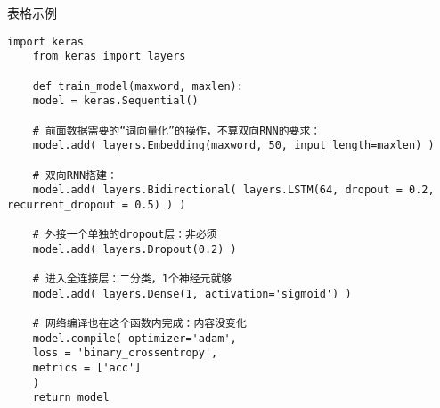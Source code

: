 表格示例


\begin{lstlisting}[caption = cs代码表测试]
	import keras
	from keras import layers
	
	def train_model(maxword, maxlen):
	model = keras.Sequential()
	
	# 前面数据需要的“词向量化”的操作，不算双向RNN的要求：
	model.add( layers.Embedding(maxword, 50, input_length=maxlen) )
	
	# 双向RNN搭建：
	model.add( layers.Bidirectional( layers.LSTM(64, dropout = 0.2, recurrent_dropout = 0.5) ) )
	
	# 外接一个单独的dropout层：非必须
	model.add( layers.Dropout(0.2) )
	
	# 进入全连接层：二分类，1个神经元就够
	model.add( layers.Dense(1, activation='sigmoid') )
	
	# 网络编译也在这个函数内完成：内容没变化
	model.compile( optimizer='adam',
	loss = 'binary_crossentropy',
	metrics = ['acc']
	) 
	return model
\end{lstlisting}